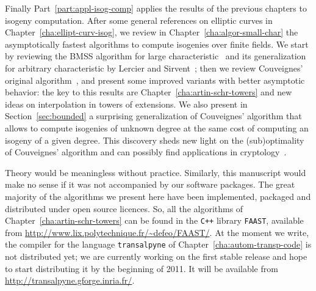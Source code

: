 Finally Part~\ref{part:appl-isog-comp} applies the results of the
previous chapters to isogeny computation. After some general
references on elliptic curves in Chapter~\ref{cha:ellipt-curv-isog},
we review in Chapter~\ref{cha:algor-small-char} the asymptotically
fastest algorithms to compute isogenies over finite fields.  We start
by reviewing the BMSS algorithm for large
characteristic~\cite{bostan+morain+salvy+schost08} and its
generalization for arbitrary characteristic by Lercier and
Sirvent~\cite{lercier+sirvent08}; then we review Couveignes' original
algorithm~\cite{couveignes96}, and present some improved variants with
better asymptotic behavior: the key to this results are
Chapter~\ref{cha:artin-schr-towers} and new ideas on interpolation in
towers of extensions.  We also present in Section~\ref{sec:bounded} a
surprising generalization of Couveignes' algorithm that allows to
compute isogenies of unknown degree at the same cost of computing an
isogeny of a given degree.  This discovery sheds new light on the
(sub)optimality of Couveignes' algorithm and can possibly find
applications in
cryptology~\cite{gaudry+hess+smart02,GHS,hess03,teske06}.

Theory would be meaningless without practice. Similarly, this
manuscript would make no sense if it was not accompanied by our
software packages. The great majority of the algorithms we present
here have been implemented, packaged and distributed under open source
licences. So, all the algorithms of
Chapter~\ref{cha:artin-schr-towers} can be found in the \texttt{C++}
library \texttt{FAAST}, available from
\url{http://www.lix.polytechnique.fr/~defeo/FAAST/}. At the
moment we write, the compiler for the language \texttt{transalpyne} of
Chapter~\ref{cha:autom-transp-code} is not distributed yet; we are
currently working on the first stable release and hope to start
distributing it by the beginning of 2011. It will be available from
\url{ http://transalpyne.gforge.inria.fr/}.




